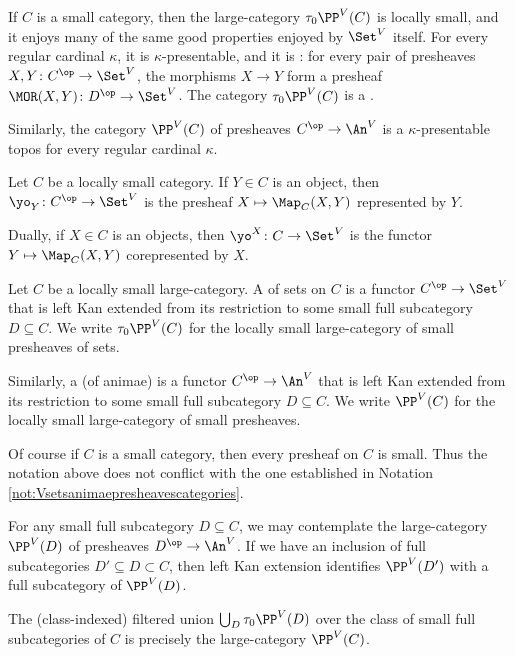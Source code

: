 \begin{nul}
	If $ C $ is a small category, then 
	the large-category $ \tau_0\PP^V(C) $ is locally small,
	and it enjoys many of the same good properties
	enjoyed by $ \Set^V $ itself.
	For every regular cardinal $ \kappa $,
	it is $ \kappa $-presentable,
	and it is :
	for every pair of presheaves $ X, Y \colon C^{\op} \to \Set^V $,
	the morphisms $ X \to Y $
	form a presheaf $ \MOR(X, Y) \colon D^{\op} \to \Set^V $.
	The category $ \tau_0\PP^V(C) $ is a .

	Similarly, the category $ \PP^V(C) $ of presheaves
	$ C^{\op} \to \An^V $
	is a $ \kappa $-presentable topos
	for every regular cardinal $ \kappa $.
\end{nul}

\begin{eg}
	Let $ C $ be a locally small category.
	If $ Y \in C $ is an object,
	then $ \yo_Y \colon C^{\op} \to \Set^V $ is
	the presheaf $ X \mapsto \Map_C(X,Y) $ represented by $ Y $.

	Dually, if $ X \in C $ is an objects,
	then $ \yo^X \colon C \to \Set^V $ is the functor
	$ Y \mapsto \Map_C(X,Y) $ corepresented by $ X $.
\end{eg}

\begin{definition}
	Let $ C $ be a locally small large-category.
	A  of sets on $ C $ is
	a functor $ C^{\op} \to \Set^V $
	that is left Kan extended from its restriction
	to some small full subcategory $ D \subseteq C $.
	We write $ \tau_0\PP^V(C) $
	for the locally small large-category
	of small presheaves of sets.
	
	Similarly, a  (of animae) is
	a functor $ C^{\op} \to \An^V $
	that is left Kan extended from its restriction to
	some small full subcategory $ D \subseteq C $.
	We write $ \PP^V(C) $
	for the locally small large-category
	of small presheaves.
\end{definition}

\begin{eg}
	Of course if $ C $ is a small category, then
	every presheaf on $ C $ is small.
	Thus the notation above does not conflict with the one established in
	Notation \ref{not:Vsetsanimaepresheavescategories}.
\end{eg}

\begin{nul}
	For any small full subcategory $ D \subseteq C $,
	we may contemplate the large-category $ \PP^V(D) $
	of presheaves $ D^{\op} \to \An^V $.
	If we have an inclusion of full subcategories
	$ D' \subseteq D \subset C $, then
	left Kan extension identifies $ \PP^V(D') $ with
	a full subcategory of $ \PP^V(D) $.
	
	The (class-indexed) filtered union
	$ \bigcup_D \tau_0\PP^V(D) $
	over the class of small full subcategories of $ C $
	is precisely the large-category $ \PP^V(C) $.
\end{nul}

